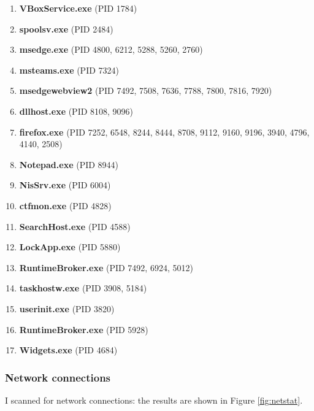 \documentclass[12pt]{article}
\begin{document}
\begin{enumerate}
\item \textbf{VBoxService.exe} (PID 1784)

\item \textbf{spoolsv.exe} (PID 2484)

\item \textbf{msedge.exe} (PID 4800, 6212, 5288, 5260, 2760)

\item \textbf{msteams.exe} (PID 7324)

\item \textbf{msedgewebview2} (PID 7492, 7508, 7636, 7788, 7800, 7816, 7920)

\item \textbf{dllhost.exe} (PID 8108, 9096)

\item \textbf{firefox.exe} (PID 7252, 6548, 8244, 8444, 8708, 9112, 9160, 9196, 3940, 4796, 4140, 2508)

\item \textbf{Notepad.exe} (PID 8944)

\item \textbf{NisSrv.exe} (PID 6004)

\item \textbf{ctfmon.exe} (PID 4828)

\item \textbf{SearchHost.exe} (PID 4588)

\item \textbf{LockApp.exe} (PID 5880)

\item \textbf{RuntimeBroker.exe} (PID 7492, 6924, 5012)

\item \textbf{taskhostw.exe} (PID 3908, 5184)

\item \textbf{userinit.exe} (PID 3820)

\item \textbf{RuntimeBroker.exe} (PID 5928)

\item \textbf{Widgets.exe} (PID 4684)
        
\end{enumerate}

\subsubsection{Network connections}

I scanned for network connections: the results are shown in Figure \ref{fig:netstat}.
\end{document}

